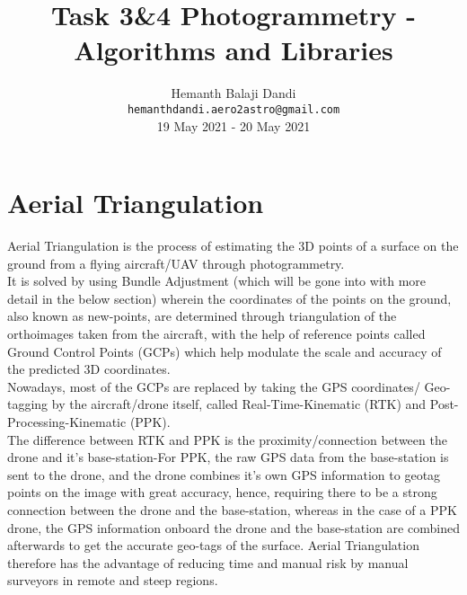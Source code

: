 \documentclass{article}[11pt]
\begin{document}
\title{ \bf Task 3\&4 Photogrammetry - Algorithms and Libraries}
\author{Hemanth Balaji Dandi\\
{\tt hemanthdandi.aero2astro@gmail.com}
\\ {19 May 2021 - 20 May 2021}
}


\date{} %

\maketitle

\onehalfspacing




\section{Aerial Triangulation}
\label{sec:stsb}

Aerial Triangulation is the process of estimating the 3D points of a surface on the ground from a flying aircraft/UAV through photogrammetry. 
\\It is solved by using Bundle Adjustment (which will be gone into with more detail in the below section) wherein the coordinates of the points on the ground, also known as new-points, are determined through triangulation of the orthoimages taken from the aircraft, with the help of reference points called Ground Control Points (GCPs) which help modulate the scale and accuracy of the predicted 3D coordinates. \\Nowadays, most of the GCPs are replaced by taking the GPS coordinates/ Geo-tagging by the aircraft/drone itself, called Real-Time-Kinematic (RTK) and Post-Processing-Kinematic (PPK).
\\The difference between RTK and PPK is the proximity/connection between the drone and it's base-station-For PPK, the raw GPS data from the base-station is sent to the drone, and the drone combines it's own GPS information to geotag points on the image with great accuracy, hence, requiring there to be a strong connection between the drone and the base-station, whereas in the case of a PPK drone, the GPS information onboard the drone and the base-station are combined afterwards to get the accurate geo-tags of the surface.
Aerial Triangulation therefore has the advantage of reducing time and manual risk by manual surveyors in remote and steep regions. 
\end{document}

